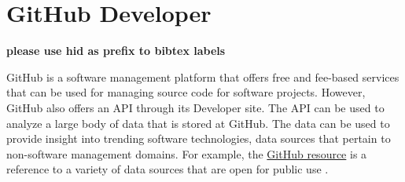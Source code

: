\section{GitHub Developer}

{\bf please use  hid as prefix to bibtex labels}

GitHub is a software management platform that offers free and fee-based
services that can be used for managing source code for software projects.
However, GitHub also offers an API through its Developer site.  The API
can be used to analyze a large body of data that is stored at GitHub.  The
data can be used to provide insight into trending software technologies, data
sources that pertain to non-software management domains.  For example, the
\href{https://github.com/OpenRefine/OpenRefine/wiki/Data-Sources}{GitHub resource} 
is a reference to a variety of data sources that are open for public use 
\cite{GitHub.com2018}.
